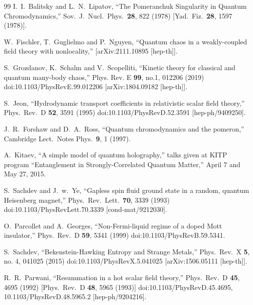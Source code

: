 \documentclass[12pt]{article}
\begin{document}
\begin{thebibliography}{99}
  I.~I.~Balitsky and L.~N.~Lipatov,
  ``The Pomeranchuk Singularity in Quantum Chromodynamics,''
  Sov.\ J.\ Nucl.\ Phys.\  {\bf 28}, 822 (1978)
  [Yad.\ Fiz.\  {\bf 28}, 1597 (1978)].

W.~Fischler, T.~Guglielmo and P.~Nguyen,
``Quantum chaos in a weakly-coupled field theory with nonlocality,''
[arXiv:2111.10895 [hep-th]].

S.~Grozdanov, K.~Schalm and V.~Scopelliti,
``Kinetic theory for classical and quantum many-body chaos,''
Phys. Rev. E \textbf{99}, no.1, 012206 (2019)
doi:10.1103/PhysRevE.99.012206
[arXiv:1804.09182 [hep-th]].


  S.~Jeon,
  ``Hydrodynamic transport coefficients in relativistic scalar field theory,''
  Phys.\ Rev.\ D {\bf 52}, 3591 (1995)
  doi:10.1103/PhysRevD.52.3591
  [hep-ph/9409250].
 

  J.~R.~Forshaw and D.~A.~Ross,
  ``Quantum chromodynamics and the pomeron,''
  Cambridge Lect.\ Notes Phys.\  {\bf 9}, 1 (1997).

 A.~Kitaev, ``A simple model of quantum holography,'' talks given at KITP program ``Entanglement in Strongly-Correlated Quantum Matter,'' April 7 and May 27, 2015.

  S.~Sachdev and J.~w.~Ye,
  ``Gapless spin fluid ground state in a random, quantum Heisenberg magnet,''
  Phys.\ Rev.\ Lett.\  {\bf 70}, 3339 (1993)
  doi:10.1103/PhysRevLett.70.3339
  [cond-mat/9212030].
  
  

  O.~Parcollet and A.~Georges,
  ``Non-Fermi-liquid regime of a doped Mott insulator,''
  Phys.\ Rev.\ D {\bf 59}, 5341 (1999)
  doi:10.1103/PhysRevB.59.5341.
  
  

  S.~Sachdev,
  ``Bekenstein-Hawking Entropy and Strange Metals,''
  Phys.\ Rev.\ X {\bf 5}, no. 4, 041025 (2015)
  doi:10.1103/PhysRevX.5.041025
  [arXiv:1506.05111 [hep-th]].


  R.~R.~Parwani,
  ``Resummation in a hot scalar field theory,''
  Phys.\ Rev.\ D {\bf 45}, 4695 (1992)
  [Phys.\ Rev.\ D {\bf 48}, 5965 (1993)]
  doi:10.1103/PhysRevD.45.4695, 10.1103/PhysRevD.48.5965.2
  [hep-ph/9204216].
  



\end{thebibliography}
\end{document}
